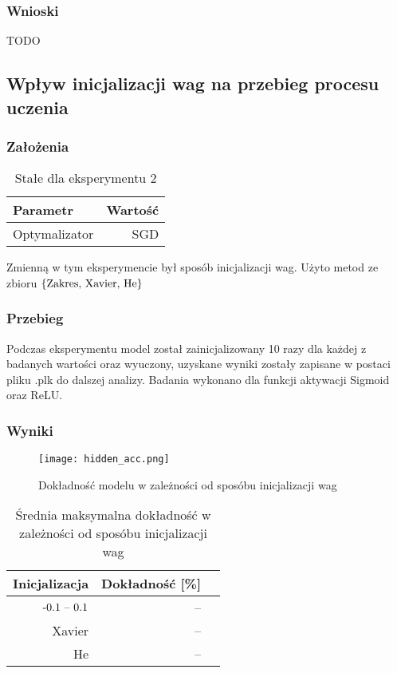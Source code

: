 \documentclass{article}
\begin{document}
\subsubsection*{Wnioski}

TODO

\newpage
\subsection{Wpływ inicjalizacji wag na przebieg procesu uczenia}
\subsubsection*{Założenia}
\begin{table}[H]
	\caption{Stałe dla eksperymentu 2}
	\label{tabela-const-2}
	\centering
	\begin{tabular}{lr}
		\toprule
		Parametr      & Wartość \\
		\midrule
		Optymalizator & SGD       \\
		\bottomrule
	\end{tabular}
\end{table}

Zmienną w tym eksperymencie był sposób inicjalizacji wag. Użyto metod ze zbioru \(\{$Zakres, Xavier, He$\}\)
\subsubsection*{Przebieg}

Podczas eksperymentu model został zainicjalizowany 10 razy dla każdej z badanych wartości oraz wyuczony, uzyskane wyniki zostały zapisane w postaci pliku .plk do dalszej analizy. Badania wykonano dla funkcji aktywacji Sigmoid oraz ReLU.

\subsubsection*{Wyniki}
\begin{figure}[H]
	\centering
	\caption{Dokładność modelu w zależności od sposóbu inicjalizacji wag}
	\texttt{[image: hidden\_acc.png]}
	\label{fig:res21}
\end{figure}

\begin{table}[H]
	\caption{Średnia maksymalna dokładność w zależności od sposóbu inicjalizacji wag}
	\label{tabela-res-21}
	\centering
	\begin{tabular}{rrr}
		\toprule
		Inicjalizacja     & Dokładność [\%] \\
		\midrule
		\($-0.1 -- 0.1$\) & --                 \\
		Xavier            & --                 \\
		He                & --                 \\
		\bottomrule
	\end{tabular}
\end{table}
\end{document}
